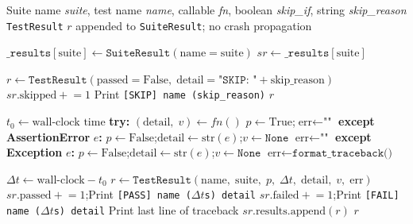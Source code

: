 \documentclass[12pt,a4paper]{article}
\begin{document}
\begin{algorithm}[H]
\caption{\texttt{\_run(suite, name, fn, skip\_if, skip\_reason)} --- Universal test executor}
\label{alg:run}
\begin{algorithmic}[1]
\Require Suite name \textit{suite}, test name \textit{name}, callable \textit{fn},
         boolean \textit{skip\_if}, string \textit{skip\_reason}
\Ensure \texttt{TestResult} $r$ appended to \texttt{SuiteResult}; no crash propagation

  \State $\texttt{\_results}[\text{suite}] \gets \texttt{SuiteResult}(\text{name}=\text{suite})$
\EndIf
\State $sr \gets \texttt{\_results}[\text{suite}]$

\vspace{4pt}
  \State $r \gets \texttt{TestResult}(\text{passed}=\text{False},\;\text{detail}=\texttt{"SKIP: "} + \text{skip\_reason})$
  \State $sr.\text{skipped} \mathrel{+}= 1$
  \State Print \texttt{[SKIP] name  (skip\_reason)}
  \State \Return $r$
\EndIf

\vspace{4pt}
\State $t_0 \gets \text{wall-clock time}$
\State \textbf{try:}
\State \quad $(\text{detail},\;v) \gets fn()$ 
\State \quad $p \gets \text{True}$;\quad $\text{err} \gets \texttt{""}$
\State \textbf{except AssertionError} $e$\textbf{:}
\State \quad $p \gets \text{False}$;\quad $\text{detail} \gets \text{str}(e)$;\quad $v \gets \texttt{None}$
\State \quad $\text{err} \gets \texttt{""}$ 
\State \textbf{except Exception} $e$\textbf{:}
\State \quad $p \gets \text{False}$;\quad $\text{detail} \gets \text{str}(e)$;\quad $v \gets \texttt{None}$
\State \quad $\text{err} \gets \texttt{format\_traceback()}$ 

\vspace{4pt}
\State $\Delta t \gets \text{wall-clock} - t_0$
\State $r \gets \texttt{TestResult}(\text{name},\;\text{suite},\;p,\;\Delta t,\;\text{detail},\;v,\;\text{err})$
  \State $sr.\text{passed} \mathrel{+}= 1$;\quad Print \texttt{[PASS] name (}$\Delta t$\texttt{s) detail}
\Else
  \State $sr.\text{failed} \mathrel{+}= 1$;\quad Print \texttt{[FAIL] name (}$\Delta t$\texttt{s) detail}
   Print last line of traceback \EndIf
\EndIf
\State $sr.\text{results.append}(r)$
\State \Return $r$
\end{algorithmic}
\end{algorithm}
\end{document}
